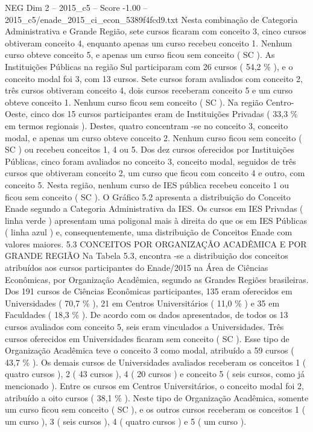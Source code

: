 \begin{textsample}{NEG Dim 2 – 2015\_c5 – Score -1.00 – 2015\_c5/enade\_2015\_ci\_econ\_5389f4fcd9.txt}
Nesta combinação de Categoria Administrativa e Grande Região, sete cursos ficaram com conceito 3, cinco cursos obtiveram conceito 4, enquanto apenas um curso recebeu conceito 1.
Nenhum curso obteve conceito 5, e apenas um curso ficou sem conceito ( SC ).
As Instituições Públicas na região Sul participaram com 26 cursos ( 54,2 \% ), e o conceito modal foi 3, com 13 cursos.
Sete cursos foram avaliados com conceito 2, três cursos obtiveram conceito 4, dois cursos receberam conceito 5 e um curso obteve conceito 1.
Nenhum curso ficou sem conceito ( SC ).
Na região Centro-Oeste, cinco dos 15 cursos participantes eram de Instituições Privadas ( 33,3 \% em termos regionais ).
Destes, quatro concentram -se no conceito 3, conceito modal, e apenas um curso obteve conceito 2.
Nenhum curso ficou sem conceito ( SC ) ou recebeu conceitos 1, 4 ou 5.
Dos dez cursos oferecidos por Instituições Públicas, cinco foram avaliados no conceito 3, conceito modal, seguidos de três cursos que obtiveram conceito 2, um curso que ficou com conceito 4 e outro, com conceito 5.
Nesta região, nenhum curso de IES pública recebeu conceito 1 ou ficou sem conceito ( SC ).
O Gráfico 5.2 apresenta a distribuição do Conceito Enade segundo a Categoria Administrativa da IES.
Os cursos em IES Privadas ( linha verde ) apresentam uma poligonal mais à direita do que os em IES Públicas ( linha azul ) e, consequentemente, uma distribuição de Conceitos Enade com valores maiores. 5.3 CONCEITOS POR ORGANIZAÇÃO ACADÊMICA E POR GRANDE REGIÃO Na Tabela 5.3, encontra -se a distribuição dos conceitos atribuídos aos cursos participantes do Enade/2015 na Área de Ciências Econômicas, por Organização Acadêmica, segundo as Grandes Regiões brasileiras.
Dos 191 cursos de Ciências Econômicas participantes, 135 eram oferecidos em Universidades ( 70,7 \% ), 21 em Centros Universitários ( 11,0 \% ) e 35 em Faculdades ( 18,3 \% ).
De acordo com os dados apresentados, de todos os 13 cursos avaliados com conceito 5, seis eram vinculados a Universidades.
Três cursos oferecidos em Universidades ficaram sem conceito ( SC ).
Esse tipo de Organização Acadêmica teve o conceito 3 como modal, atribuído a 59 cursos ( 43,7 \% ).
Os demais cursos de Universidades avaliados receberam os conceitos 1 ( quatro cursos ), 2 ( 43 cursos ), 4 ( 20 cursos ) e conceito 5 ( seis cursos, como já mencionado ).
Entre os cursos em Centros Universitários, o conceito modal foi 2, atribuído a oito cursos ( 38,1 \% ).
Neste tipo de Organização Acadêmica, somente um curso ficou sem conceito ( SC ), e os outros cursos receberam os conceitos 1 ( um curso ), 3 ( seis cursos ), 4 ( quatro cursos ) e 5 ( um curso ).

\end{textsample}
